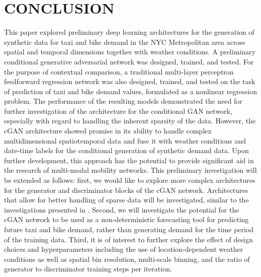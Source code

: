 \documentclass[conference]{IEEEtran}
\begin{document}
\section{CONCLUSION}
This paper explored preliminary deep learning architectures for the generation of synthetic data for taxi and bike demand in
 the NYC Metropolitan area across spatial and temporal dimensions together with weather conditions. A preliminary conditional 
 generative adversarial network was designed, trained, and tested. For the purpose of contextual comparison, a traditional 
 multi-layer perceptron feedforward regression network was also designed, trained, and tested on the task of prediction of taxi and bike
  demand values, formulated as a nonlinear regression problem. The performance of the resulting models demonstrated the need 
  for further investigation of the architecture for the conditional GAN network, especially with regard to handling the inherent
   sparsity of the data. However, the cGAN architecture showed promise in its ability to handle complex multidimensional 
   spatiotemporal data and fuse it with weather conditions and date-time labels for the conditional generation of synthetic 
   demand data. Upon further development, this approach has the potential to provide significant aid in the research of 
   multi-modal mobility networks. 
This preliminary investigation will be extended as follows: first, we would like to explore more complex architectures for 
the generator and discriminator blocks of the cGAN network. Architectures that allow for better handling of sparse data will 
be investigated, similar to the investigations presented in \cite{nash_generating_2021} \cite{yan_second_2018} \cite{uhrig_sparsity_2017}.
Second, we will investigate the potential for the cGAN network to be used as a non-deterministic forecasting tool for predicting future 
taxi and bike demand, rather than generating demand for the time period of the training data.
 Third, it is of interest to further 
explore the effect of design choices and hyperparameters including the use of location-dependent weather conditions as well 
as spatial bin resolution, multi-scale binning, and the ratio of generator to discriminator training steps per iteration.



\end{document}
